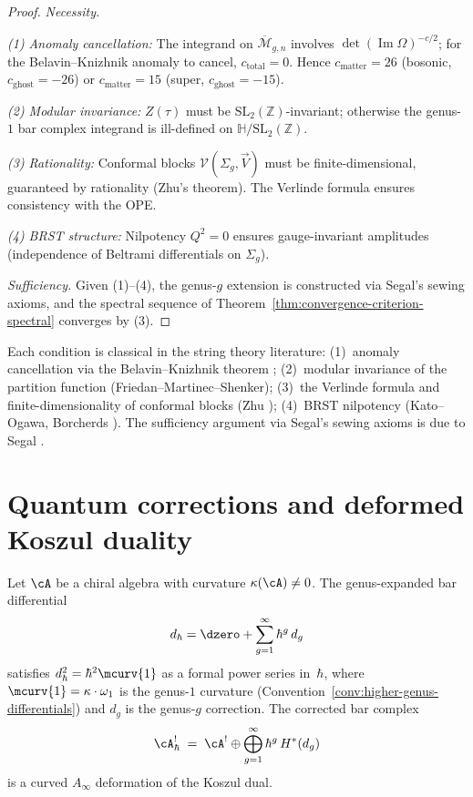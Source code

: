 \begin{proof}
\emph{Necessity.}

\emph{(1) Anomaly cancellation:} The integrand on $\overline{\mathcal{M}}_{g,n}$ involves $\det(\operatorname{Im} \Omega)^{-c/2}$; for the Belavin--Knizhnik anomaly to cancel, $c_{\mathrm{total}} = 0$.  Hence $c_{\mathrm{matter}} = 26$ (bosonic, $c_{\mathrm{ghost}} = -26$) or $c_{\mathrm{matter}} = 15$ (super, $c_{\mathrm{ghost}} = -15$).

\emph{(2) Modular invariance:} $Z(\tau)$ must be $\mathrm{SL}_2(\mathbb{Z})$-invariant; otherwise the genus-$1$ bar complex integrand is ill-defined on $\mathbb{H}/\mathrm{SL}_2(\mathbb{Z})$.

\emph{(3) Rationality:} Conformal blocks $\mathcal{V}(\Sigma_g, \vec{V})$ must be finite-dimensional, guaranteed by rationality (Zhu's theorem).  The Verlinde formula ensures consistency with the OPE.

\emph{(4) BRST structure:} Nilpotency $Q^2 = 0$ ensures gauge-invariant amplitudes (independence of Beltrami differentials on $\Sigma_g$).

\emph{Sufficiency.}
Given (1)--(4), the genus-$g$ extension is constructed via Segal's sewing axioms, and the spectral sequence of Theorem~\ref{thm:convergence-criterion-spectral} converges by (3).
\end{proof}

\begin{remark}[Provenance]
Each condition is classical in the string theory literature:
(1)~anomaly cancellation via the Belavin--Knizhnik theorem \cite{BK86};
(2)~modular invariance of the partition function (Friedan--Martinec--Shenker);
(3)~the Verlinde formula and finite-dimensionality of conformal blocks (Zhu \cite{Zhu96});
(4)~BRST nilpotency (Kato--Ogawa, Borcherds \cite{Bor92}).
The sufficiency argument via Segal's sewing axioms is due to Segal \cite{Seg04}.
\end{remark}

\section{Quantum corrections and deformed Koszul duality}

\begin{theorem}
\label{thm:genus-deformation-exact}
Let $\cA$ be a chiral algebra with curvature
$\kappa(\cA) \neq 0$.  The genus-expanded bar
differential
\[
d_{\hbar} = \dzero + \sum_{g=1}^\infty \hbar^g\, d_g
\]
satisfies $d_\hbar^2 = \hbar^2 \mcurv{1}$ as a formal power
series in~$\hbar$, where $\mcurv{1} = \kappa \cdot
\omega_1$ is the genus-$1$ curvature
(Convention~\textup{\ref{conv:higher-genus-differentials}})
and $d_g$ is the genus-$g$ correction.  The corrected bar complex
\[
\cA^!_\hbar \;=\; \cA^! \oplus
\bigoplus_{g=1}^\infty \hbar^g \, H^*(d_g)
\]
is a curved $A_\infty$ deformation of the Koszul dual.
\end{theorem}

